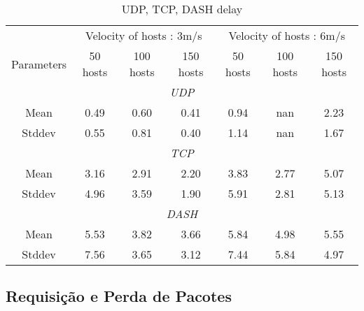 \documentclass[12pt]{article}
\begin{document}
\begin{table}[h!] 
  \centering
  \caption{UDP, TCP, DASH delay}
  \begin{tabular}{c|ccc|ccc}
    \hline
    \multicolumn{1}{c}{} & \multicolumn{3}{c}{Velocity of hosts : 3m/s} & \multicolumn{3}{c}{Velocity of hosts : 6m/s} 			\\ 
    Parameters             & 50 hosts      & 100 hosts     & 150 hosts     &   50 hosts      & 100 hosts     & 150 hosts     		\\ 
    \hline
    \hline
    \multicolumn{7}{c}{\textit{UDP}} \\
    \hline
    \hline
    Mean         & 0.49     & 0.60   & 0.41   &    0.94  & nan    &  2.23  \\
    Stddev       & 0.55    & 0.81   & 0.40   &    1.14  & nan    &  1.67  \\
    \hline
    \hline
    \multicolumn{7}{c}{\textit{TCP}} \\
    \hline
    \hline
    Mean         & 3.16   & 2.91   & 2.20   &    3.83  & 2.77    &  5.07  \\
    Stddev       & 4.96   & 3.59   & 1.90   &    5.91  & 2.81    &  5.13  \\
    \hline
    \hline
    \multicolumn{7}{c}{\textit{DASH}} \\
    \hline
    \hline
    Mean         & 5.53   & 3.82   & 3.66   &    5.84  & 4.98    &  5.55  \\
    Stddev       & 7.56  & 3.65   & 3.12   &    7.44  & 5.84    &  4.97  \\
    \hline
  \end{tabular}
  \label{tab:tabledelay}
\end{table}
\FloatBarrier

\subsection{Requisição e Perda de Pacotes} \label{sec:perda}
\end{document}
